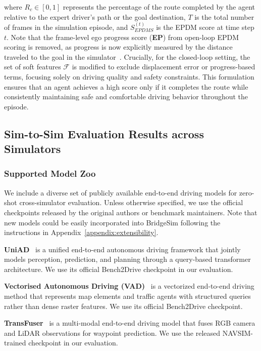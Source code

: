 \documentclass{article}
\begin{document}
where $R_c\in[0, 1]$ represents the percentage of the route completed by the agent relative to the expert driver's path or the goal destination, $T$ is the total number of frames in the simulation episode, and $S_{EPDMS}^{(t)}$ is the EPDM score at time step $t$. Note that the frame-level ego progress score (\textbf{EP}) from open-loop EPDM scoring is removed, as progress is now explicitly measured by the distance traveled to the goal in the simulator~\cite{zhou2024hugsim}. Crucially, for the closed-loop setting, the set of soft features $\mathcal{F}$ is modified to exclude displacement error or progress-based terms, focusing solely on driving quality and safety constraints. This formulation ensures that an agent achieves a high score only if it completes the route while consistently maintaining safe and comfortable driving behavior throughout the episode.

\subsection{Sim-to-Sim Evaluation Results across Simulators}

\subsubsection{Supported Model Zoo}
We include a diverse set of publicly available end-to-end driving models for zero-shot cross-simulator evaluation. Unless otherwise specified, we use the official checkpoints released by the original authors or benchmark maintainers. Note that new models could be easily incorporated into BridgeSim following the instructions in Appendix~\ref{appendix:extensibility}.

\textbf{UniAD}~\cite{uniad} is a unified end-to-end autonomous driving framework that jointly models perception, prediction, and planning through a query-based transformer architecture. We use its official Bench2Drive checkpoint in our evaluation.

\textbf{Vectorised Autonomous Driving (VAD)}~\cite{vad} is a vectorized end-to-end driving method that represents map elements and traffic agents with structured queries rather than dense raster features. We use its official Bench2Drive checkpoint.

\textbf{TransFuser}~\cite{transfuser} is a multi-modal end-to-end driving model that fuses RGB camera and LiDAR observations for waypoint prediction. We use the released NAVSIM-trained checkpoint in our evaluation.
\end{document}
